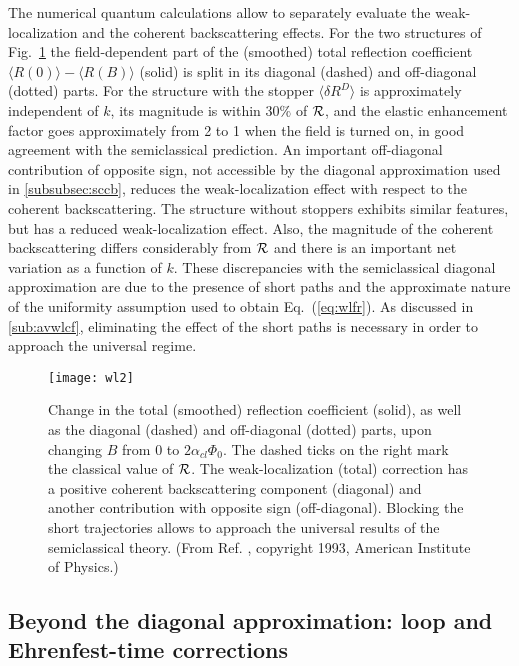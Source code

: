 \documentclass[a4paper,10pt]{article}
\newcommand{\nin}{\noindent}
\begin{document}
\nin The numerical quantum calculations allow to separately evaluate the weak-localization and the coherent backscattering effects. For the two structures of Fig.~\ref{fig:wl2} the field-dependent part of
the (smoothed) total reflection coefficient 
$\langle R(0) \rangle - \langle R(B) \rangle$
(solid) is  split in its diagonal (dashed) and off-diagonal (dotted)
parts. For the structure with the stopper $\langle \delta
R^D \rangle$ is approximately independent of $k$, its 
magnitude is within  $30 \% $ of ${\cal R}$, and the elastic
enhancement factor goes approximately from 2 to 1 when the field is
turned on, in good agreement with the semiclassical prediction. An important off-diagonal contribution of opposite sign, not accessible by the diagonal approximation used in \ref{subsubsec:sccb}, reduces the weak-localization effect with respect to the coherent backscattering. 
The structure without stoppers exhibits similar features,
but has a reduced weak-localization effect. Also,
the magnitude of the coherent backscattering differs
considerably from ${\cal R}$ and there is an important
net variation as a function of $k$. These discrepancies with the semiclassical diagonal approximation are due to the presence of short 
paths and the approximate nature of the uniformity assumption used to
obtain Eq.~(\ref{eq:wlfr}). As discussed in \ref{sub:avwlcf}, eliminating the effect of the short paths is necessary in order to approach the universal regime.

\begin{figure}
\setlength{\unitlength}{1mm}
\centerline{\texttt{[image: wl2]}}
\caption{
Change in the total (smoothed) reflection coefficient (solid), as well as  the diagonal
(dashed) and off-diagonal (dotted) parts, upon changing $B$ from $0$
to $2 \alpha_{cl} \Phi_{0}$. The dashed ticks on the right mark the classical value of ${\cal R}$. The weak-localization (total) correction has  a positive coherent backscattering component (diagonal) and another contribution with opposite sign (off-diagonal). Blocking the short trajectories allows to approach the universal results of the semiclassical theory. (From Ref. {}, copyright 1993, American Institute of Physics.)
}
\label{fig:wl2}
\end{figure}

\subsection{Beyond the diagonal approximation: loop and Ehrenfest-time corrections}
\label{subsec:bda}
\end{document}
